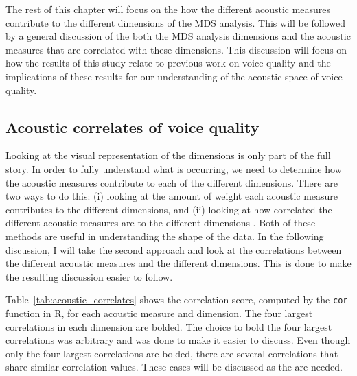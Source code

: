 The rest of this chapter will focus on the how the different acoustic measures contribute to the different dimensions of the MDS analysis. This will be followed by a general discussion of the both the MDS analysis dimensions and the acoustic measures that are correlated with these dimensions. This discussion will focus on how the results of this study relate to previous work on voice quality and the implications of these results for our understanding of the acoustic space of voice quality. 

\subsection{Acoustic correlates of voice quality} \label{sec:acousticlandscape:correlates}

Looking at the visual representation of the dimensions is only part of the full story. In order to fully understand what is occurring, we need to determine how the acoustic measures contribute to each of the different dimensions. There are two ways to do this: (i) looking at the amount of weight each acoustic measure contributes to the different dimensions, and (ii) looking at how correlated the different acoustic measures are to the different dimensions \citep{kruskalMultidimensionalScaling1978,hastieElementsStatisticalLearning2009}. Both of these methods are useful in understanding the shape of the data. In the following discussion, I will take the second approach and look at the correlations between the different acoustic measures and the different dimensions. This is done to make the resulting discussion easier to follow.   

Table~\ref{tab:acoustic_correlates} shows the correlation score, computed by the \texttt{cor} function in R, for each acoustic measure and dimension. The four largest correlations in each dimension are bolded. The choice to bold the four largest correlations was arbitrary and was done to make it easier to discuss. Even though only the four largest correlations are bolded, there are several correlations that share similar correlation values. These cases will be discussed as the are needed.

